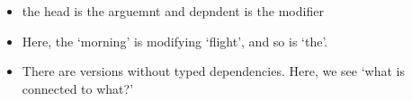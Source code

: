 \documentclass[11pt]{article}
\begin{document}
\begin{minipage}[l]{.5\linewidth}
    \begin{figure}[H]
        \centering
    \end{figure}    
\end{minipage}\hfill
\begin{minipage}[r]{.48\linewidth}
    \begin{itemize}
        \item the head is the arguemnt and depndent is the modifier
        \item Here, the `morning' is modifying `flight', and so is `the'.
    \end{itemize}
\end{minipage}

\begin{minipage}[l]{.5\linewidth}
    \begin{figure}[H]
        \centering
    \end{figure}    
\end{minipage}\hfill
\begin{minipage}[r]{.48\linewidth}
    \begin{itemize}
        \item There are versions without typed dependencies. Here, we see `what is connected to what?'
    \end{itemize}
\end{minipage}
\end{document}
